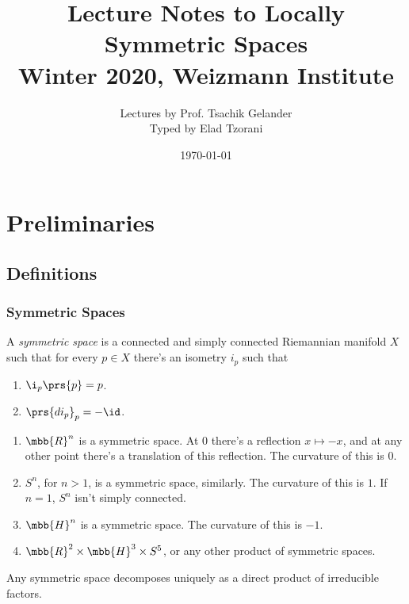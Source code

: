 \documentclass[10pt, twoside]{book}
\title{Lecture Notes to Locally Symmetric Spaces \\ \large{Winter 2020, Weizmann Institute}}
\author{Lectures by Prof. Tsachik Gelander \\ \small{Typed by Elad Tzorani}}
\date{\today}
\begin{document}
\maketitle
\tableofcontents

\chapter{Preliminaries}

\section{Definitions}

\subsection{Symmetric Spaces}

\begin{definition}
A \emph{symmetric space} is a connected and simply connected Riemannian manifold $X$ such that for every $p \in X$ there's an isometry $i_p$ such that
\begin{enumerate}
\item $\i_p\prs{p} = p$.
\item $\prs{d i_p}_p = -\id$.
\end{enumerate}
\end{definition}

\begin{examples*}
\enumthm
\begin{enumerate}
\item $\mbb{R}^n$ is a symmetric space. At $0$ there's a reflection $x \mapsto -x$, and at any other point there's a translation of this reflection. The curvature of this is $0$.
\item $S^n$, for $n > 1$, is a symmetric space, similarly. The curvature of this is $1$. If $n = 1$, $S^n$ isn't simply connected.
\item $\mbb{H}^n$ is a symmetric space. The curvature of this is $-1$.
\item $\mbb{R}^2 \times \mbb{H}^3 \times S^5$, or any other product of symmetric spaces.
\end{enumerate}
\end{examples*}

\begin{proposition}
Any symmetric space decomposes uniquely as a direct product of irreducible factors.
\end{proposition}
\end{document}
